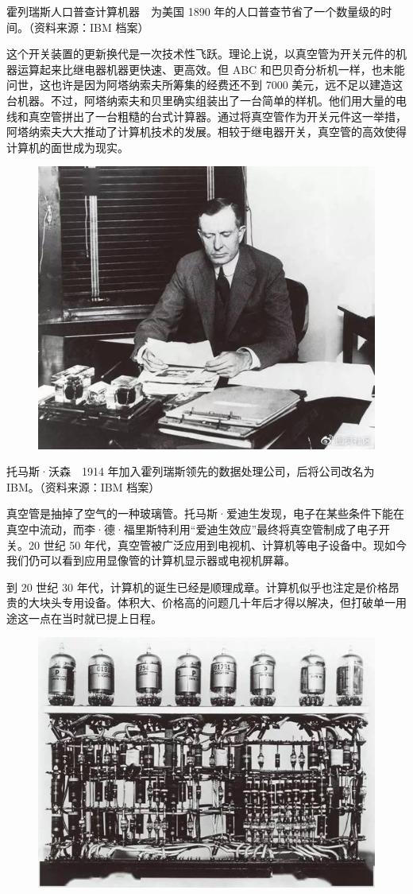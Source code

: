 \documentclass[12pt,UTF8]{ctexbook}
\begin{document}
霍列瑞斯人口普查计算机器　为美国 1890 年的人口普查节省了一个数量级的时间。（资料来源：IBM 档案）

这个开关装置的更新换代是一次技术性飞跃。理论上说，以真空管为开关元件的机器运算起来比继电器机器更快速、更高效。但 ABC 和巴贝奇分析机一样，也未能问世，这也许是因为阿塔纳索夫所筹集的经费还不到 7000 美元，远不足以建造这台机器。不过，阿塔纳索夫和贝里确实组装出了一台简单的样机。他们用大量的电线和真空管拼出了一台粗糙的台式计算器。通过将真空管作为开关元件这一举措，阿塔纳索夫大大推动了计算机技术的发展。相较于继电器开关，真空管的高效使得计算机的面世成为现实。

\begin{figure}[htbp]
	\centering
	\includegraphics[width=0.7\linewidth]{5}
	\caption{}
	\label{fig:1}
\end{figure}

托马斯·沃森　1914 年加入霍列瑞斯领先的数据处理公司，后将公司改名为 IBM。（资料来源：IBM 档案）

真空管是抽掉了空气的一种玻璃管。托马斯·爱迪生发现，电子在某些条件下能在真空中流动，而李·德·福里斯特利用“爱迪生效应”最终将真空管制成了电子开关。20 世纪 50 年代，真空管被广泛应用到电视机、计算机等电子设备中。现如今我们仍可以看到应用显像管的计算机显示器或电视机屏幕。

到 20 世纪 30 年代，计算机的诞生已经是顺理成章。计算机似乎也注定是价格昂贵的大块头专用设备。体积大、价格高的问题几十年后才得以解决，但打破单一用途这一点在当时就已提上日程。

\begin{figure}[htbp]
	\centering
	\includegraphics[width=0.7\linewidth]{6}
	\caption{}
	\label{fig:1}
\end{figure}
\end{document}
